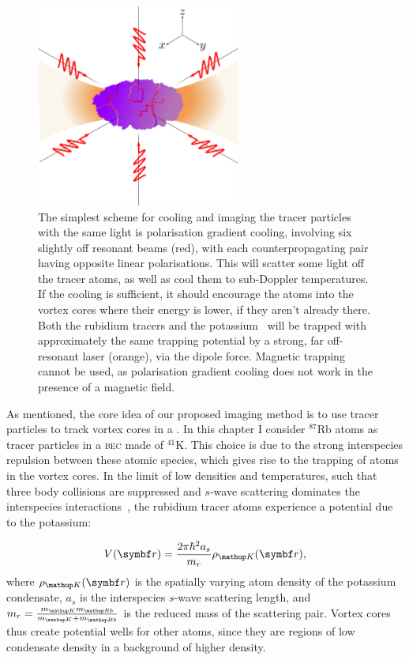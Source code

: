 \begin{figure}
\begin{center}
\includegraphics[width=0.6\textwidth]{figures/unsorted/setup.png}
\caption{\label{fig:setup}The simplest scheme for cooling and imaging the tracer particles with the same light is polarisation gradient cooling, involving six slightly off resonant beams (red), with each counterpropagating pair having opposite linear polarisations. This will scatter some light off the tracer atoms, as well as cool them to sub-Doppler temperatures. If the cooling is sufficient, it should encourage the atoms into the vortex cores where their energy is lower, if they aren't already there. Both the rubidium tracers and the potassium \bec\ will be trapped with approximately the same trapping potential by a strong, far off-resonant laser (orange), via the dipole force. Magnetic trapping cannot be used, as polarisation gradient cooling does not work in the presence of a magnetic field.}
\end{center}
\end{figure}

As mentioned, the core idea of our proposed imaging method is to use tracer particles to track vortex cores in a \bec. In this chapter I consider $^{87}$Rb atoms as tracer particles in a \textsc{bec} made of $^{41}$K. This choice is due to the strong interspecies repulsion between these atomic species, which gives rise to the trapping of atoms in the vortex cores. In the limit of low densities and temperatures, such that three body collisions are suppressed and $s$-wave scattering dominates the interspecies interactions~\cite[p 120]{leggett_quantum_2006}, the rubidium tracer atoms experience a potential due to the potassium:

\begin{equation}
V(\vec{r}) = \frac{2\pi\hbar^2 a_s}{m_r}\rho_\up{K}(\vec{r}),
\end{equation}
where $\rho_\up{K}(\vec{r})$ is the spatially varying atom density of the potassium condensate, $a_s$ is the interspecies $s$-wave scattering length, and
$m_r = \frac{m_\up{K}m_\up{Rb}}{m_\up{K} + m_\up{Rb}}$ is the reduced mass of the scattering pair. Vortex cores thus create potential wells for other atoms, since they are regions of low condensate density in a background of higher density.

